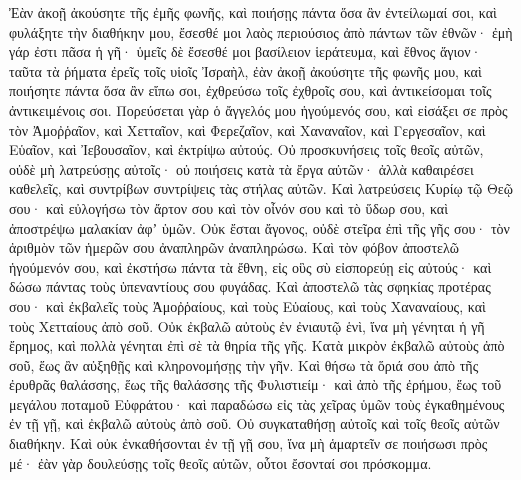{Ἐὰν ἀκοῇ ἀκούσητε τῆς ἐμῆς φωνῆς, καὶ ποιήσῃς πάντα ὅσα ἂν ἐντείλωμαί σοι, καὶ φυλάξητε τὴν διαθήκην μου, ἔσεσθέ μοι λαὸς περιούσιος ἀπὸ πάντων τῶν ἐθνῶν· ἐμὴ γάρ ἐστι πᾶσα ἡ γῆ· ὑμεῖς δὲ ἔσεσθέ μοι βασίλειον ἱεράτευμα, καὶ ἔθνος ἅγιον· ταῦτα τὰ ῥήματα ἐρεῖς τοῖς υἱοῖς Ἰσραὴλ, ἐὰν ἀκοῇ ἀκούσητε τῆς φωνῆς μου, καὶ ποιήσητε πάντα ὅσα ἂν εἴπω σοι, ἐχθρεύσω τοῖς ἐχθροῖς σου, καὶ ἀντικείσομαι τοῖς ἀντικειμένοις σοι.
Πορεύσεται γὰρ ὁ ἄγγελός μου ἡγούμενός σου, καὶ εἰσάξει σε πρὸς τὸν Ἀμοῤῥαῖον, καὶ Χετταῖον, καὶ Φερεζαῖον, καὶ Χαναναῖον, καὶ Γεργεσαῖον, καὶ Εὑαῖον, καὶ Ἰεβουσαῖον, καὶ ἐκτρίψω αὐτούς.
Οὐ προσκυνήσεις τοῖς θεοῖς αὐτῶν, οὐδὲ μὴ λατρεύσῃς αὐτοῖς· οὐ ποιήσεις κατὰ τὰ ἔργα αὐτῶν· ἀλλὰ καθαιρέσει καθελεῖς, καὶ συντρίβων συντρίψεις τὰς στήλας αὐτῶν.
Καὶ λατρεύσεις Κυρίῳ τῷ Θεῷ σου· καὶ εὐλογήσω τὸν ἄρτον σου καὶ τὸν οἶνόν σου καὶ τὸ ὕδωρ σου, καὶ ἀποστρέψω μαλακίαν ἀφʼ ὑμῶν.
Οὐκ ἔσται ἄγονος, οὐδὲ στεῖρα ἐπὶ τῆς γῆς σου· τὸν ἀριθμὸν τῶν ἡμερῶν σου ἀναπληρῶν ἀναπληρώσω.
Καὶ τὸν φόβον ἀποστελῶ ἡγούμενόν σου, καὶ ἐκστήσω πάντα τὰ ἔθνη, εἰς οὓς σὺ εἰσπορεύῃ εἰς αὐτούς· καὶ δώσω πάντας τοὺς ὑπεναντίους σου φυγάδας.
Καὶ ἀποστελῶ τὰς σφηκίας προτέρας σου· καὶ ἐκβαλεῖς τοὺς Ἀμοῤῥαίους, καὶ τοὺς Εὑαίους, καὶ τοὺς Χαναναίους, καὶ τοὺς Χετταίους ἀπὸ σοῦ.
Οὐκ ἐκβαλῶ αὐτοὺς ἐν ἐνιαυτῷ ἑνὶ, ἵνα μὴ γένηται ἡ γῆ ἔρημος, καὶ πολλὰ γένηται ἐπὶ σὲ τὰ θηρία τῆς γῆς.
Κατὰ μικρὸν ἐκβαλῶ αὐτοὺς ἀπὸ σοῦ, ἕως ἂν αὐξηθῇς καὶ κληρονομήσῃς τὴν γῆν.
Καὶ θήσω τὰ ὅριά σου ἀπὸ τῆς ἐρυθρᾶς θαλάσσης, ἕως τῆς θαλάσσης τῆς Φυλιστιείμ· καὶ ἀπὸ τῆς ἐρήμου, ἕως τοῦ μεγάλου ποταμοῦ Εὐφράτου· καὶ παραδώσω εἰς τὰς χεῖρας ὑμῶν τοὺς ἐγκαθημένους ἐν τῇ γῇ, καὶ ἐκβαλῶ αὐτοὺς ἀπὸ σοῦ.
Οὐ συγκαταθήσῃ αὐτοῖς καὶ τοῖς θεοῖς αὐτῶν διαθήκην.
Καὶ οὐκ ἐνκαθήσονται ἐν τῇ γῇ σου, ἵνα μὴ ἁμαρτεῖν σε ποιήσωσι πρὸς μέ· ἐὰν γὰρ δουλεύσῃς τοῖς θεοῖς αὐτῶν, οὗτοι ἔσονταί σοι πρόσκομμα.

}
